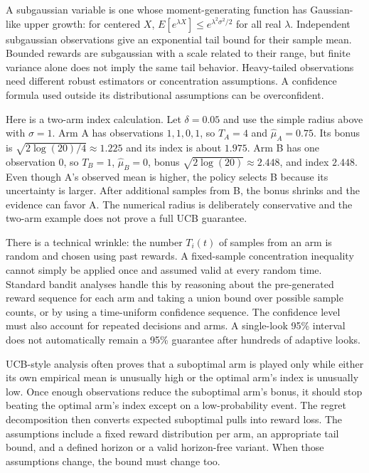 A subgaussian variable is one whose moment-generating function has Gaussian-like upper growth: for centered \(X\), \(E[e^{\lambda X}]\le e^{\lambda^2\sigma^2/2}\) for all real \(\lambda\). Independent subgaussian observations give an exponential tail bound for their sample mean. Bounded rewards are subgaussian with a scale related to their range, but finite variance alone does not imply the same tail behavior. Heavy-tailed observations need different robust estimators or concentration assumptions. A confidence formula used outside its distributional assumptions can be overconfident.

Here is a two-arm index calculation. Let \(\delta=0.05\) and use the simple radius above with \(\sigma=1\). Arm A has observations \(1,1,0,1\), so \(T_A=4\) and \(\hat\mu_A=0.75\). Its bonus is \(\sqrt{2\log(20)/4}\approx1.225\) and its index is about \(1.975\). Arm B has one observation \(0\), so \(T_B=1\), \(\hat\mu_B=0\), bonus \(\sqrt{2\log(20)}\approx2.448\), and index \(2.448\). Even though A's observed mean is higher, the policy selects B because its uncertainty is larger. After additional samples from B, the bonus shrinks and the evidence can favor A. The numerical radius is deliberately conservative and the two-arm example does not prove a full UCB guarantee.

There is a technical wrinkle: the number \(T_i(t)\) of samples from an arm is random and chosen using past rewards. A fixed-sample concentration inequality cannot simply be applied once and assumed valid at every random time. Standard bandit analyses handle this by reasoning about the pre-generated reward sequence for each arm and taking a union bound over possible sample counts, or by using a time-uniform confidence sequence. The confidence level must also account for repeated decisions and arms. A single-look 95\% interval does not automatically remain a 95\% guarantee after hundreds of adaptive looks.

UCB-style analysis often proves that a suboptimal arm is played only while either its own empirical mean is unusually high or the optimal arm's index is unusually low. Once enough observations reduce the suboptimal arm's bonus, it should stop beating the optimal arm's index except on a low-probability event. The regret decomposition then converts expected suboptimal pulls into reward loss. The assumptions include a fixed reward distribution per arm, an appropriate tail bound, and a defined horizon or a valid horizon-free variant. When those assumptions change, the bound must change too.

